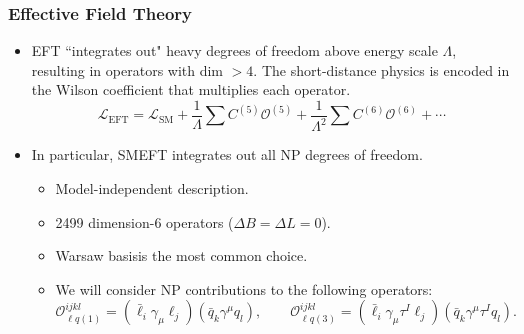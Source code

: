 \documentclass[mathserif, 10pt]{beamer}
\begin{document}
\begin{frame}\frametitle{Effective Field Theory}
    \def\beamertemplatetransparentcoveredmedium{}
    \beamertemplatetransparentcoveredmedium
    \begin{itemize}
        \item  EFT ``integrates out" heavy degrees of freedom above energy scale $\Lambda$, resulting in operators with dim $> 4$. The short-distance physics is encoded in the Wilson coefficient that multiplies each operator.
              $$\mathcal{L}_\mathrm{EFT} = \mathcal{L}_\mathrm{SM} + \frac{1}{\Lambda}\sum C^{(5)} \mathcal{O}^{(5)} + \frac{1}{\Lambda^2}\sum C^{(6)} \mathcal{O}^{(6)} + \cdots$$
              \vspace{-2mm}
        \item In particular, SMEFT integrates out all NP degrees of freedom.
              \begin{itemize}
                  \item Model-independent description.
                  \item 2499 dimension-6 operators ($\Delta B = \Delta L = 0$).
\item Warsaw basis\footnotemark[3] is the most common choice.
                  \item We will consider NP contributions to the following operators:
                        $$\mathcal{O}_{\ell q(1)}^{ijkl} = (\bar{\ell}_i \gamma_\mu \ell_j)(\bar{q}_k \gamma^\mu  q_l), \qquad \mathcal{O}_{\ell q(3)}^{ijkl} = (\bar{\ell}_i \gamma_\mu \tau^I \ell_j)(\bar{q}_k \gamma^\mu \tau^I q_l).$$
              \end{itemize}
    \end{itemize}
\end{frame}
\end{document}

